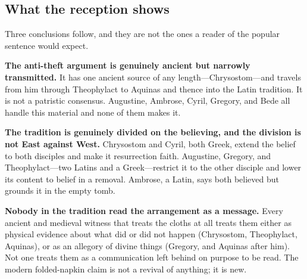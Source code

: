 \subsection{What the reception shows}

Three conclusions follow, and they are not the ones a reader of the popular
sentence would expect.

\textbf{The anti-theft argument is genuinely ancient but narrowly transmitted.}
It has one ancient source of any length---Chrysostom---and travels from him
through Theophylact to Aquinas and thence into the Latin tradition. It is not
a patristic consensus. Augustine, Ambrose, Cyril, Gregory, and Bede all handle
this material and none of them makes it.

\textbf{The tradition is genuinely divided on the believing, and the division is
not East against West.} Chrysostom and Cyril, both Greek, extend the belief to
both disciples and make it resurrection faith. Augustine, Gregory, and
Theophylact---two Latins and a Greek---restrict it to the other disciple and
lower its content to belief in a removal. Ambrose, a Latin, says both believed
but grounds it in the empty tomb.

\textbf{Nobody in the tradition read the arrangement as a message.} Every
ancient and medieval witness that treats the cloths at all treats them either as
physical evidence about what did or did not happen (Chrysostom, Theophylact,
Aquinas), or as an allegory of divine things (Gregory, and Aquinas after him).
Not one treats them as a communication left behind on purpose to be read. The
modern folded-napkin claim is not a revival of anything; it is new.
